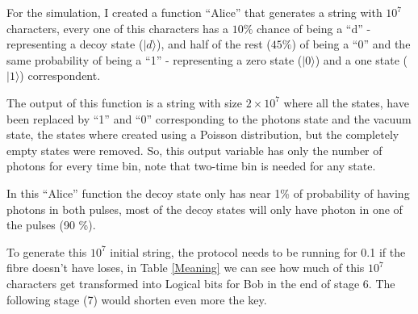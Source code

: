 \begin{refsection}
For the simulation, I created a function ``Alice'' that generates a string with $10^7$ characters, every one of this characters has a $10 \%$ chance of being a ``d'' - representing a decoy state ($|d\rangle$), and half of the rest ($45 \%$) of being a ``0'' and the same probability of being a ``1'' - representing a zero state ($|0\rangle$) and a one state ($|1\rangle$) correspondent. 

The output of this function is a string with size $2\times10^7$ where all the states, have been replaced by ``1'' and ``0'' corresponding to the photons state and the vacuum state, the states where created using a Poisson distribution, but the completely empty states were removed. So, this output variable has only the number of photons for every time bin, note that two-time bin is needed for any state.

In this ``Alice'' function the decoy state only has near 1\% of probability of having photons in both pulses, most of the decoy states will only have photon in one of the pulses (90 \%).

To generate this $10^7$ initial string, the protocol needs to be running for 0.1 if the fibre doesn't have loses, in Table \ref{Meaning} we can see how much of this $10^7$ characters get transformed into Logical bits for Bob in the end of stage 6. The following stage (7) would shorten even more the key.



\end{refsection}
